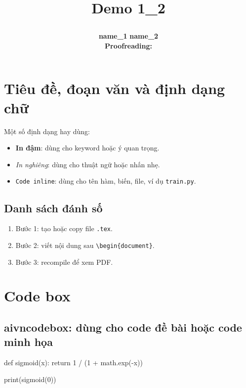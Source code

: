 \documentclass[12pt]{article}
\title{%
  \parbox[c][\TitleBlockHeight][c]{0.90\textwidth}{%
    \centering
    {\fontsize{20pt}{24pt}\selectfont\bfseries Demo 1_2}
  }%
}
\author{%
  \textbf{name\_1}
  \hspace{2.8em}
  \textbf{name\_2}\\
  \vspace{1em}
  \textbf{Proofreading: }
}
\date{}
\begin{document}
\maketitle
\thispagestyle{firstpage}
\vspace{-3em}

\section{Tiêu đề, đoạn văn và định dạng chữ}

Một số định dạng hay dùng:
\begin{itemize}
    \item \textbf{In đậm}: dùng cho keyword hoặc ý quan trọng.
    \item \textit{In nghiêng}: dùng cho thuật ngữ hoặc nhấn nhẹ.
    \item \texttt{Code inline}: dùng cho tên hàm, biến, file, ví dụ \texttt{train.py}.
\end{itemize}

\subsection{Danh sách đánh số}

\begin{enumerate}
    \item Bước 1: tạo hoặc copy file \texttt{.tex}.
    \item Bước 2: viết nội dung sau \texttt{\textbackslash begin\{document\}}.
    \item Bước 3: recompile để xem PDF.
\end{enumerate}

\section{Code box}

\subsection{aivncodebox: dùng cho code đề bài hoặc code minh họa}

\begin{aivncodebox}
\begin{python}
def sigmoid(x):
    return 1 / (1 + math.exp(-x))

print(sigmoid(0))
\end{python}
\end{aivncodebox}
\end{document}
